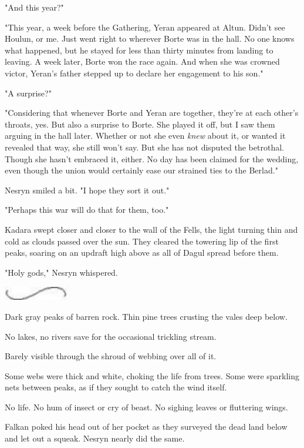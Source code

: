"And this year?"

"This year, a week before the Gathering, Yeran appeared at Altun. Didn't see Houlun, or me. Just went right to wherever Borte was in the hall. No one knows what happened, but he stayed for less than thirty minutes from landing to leaving. A week later, Borte won the race again. And when she was crowned victor, Yeran's father stepped up to declare her engagement to his son."

"A surprise?"

"Considering that whenever Borte and Yeran are together, they're at each other's throats, yes. But also a surprise to Borte. She played it off, but I saw them arguing in the hall later. Whether or not she even
\emph{knew} about it, or wanted it revealed that way, she still won't say. But she has not disputed the betrothal. Though she hasn't embraced it, either. No day has been claimed for the wedding, even though the union would certainly ease our  strained ties to the Berlad."

Nesryn smiled a bit. "I hope they sort it out."

"Perhaps this war will do that for them, too."

Kadara swept closer and closer to the wall of the Fells, the light turning thin and cold as clouds passed over the sun. They cleared the towering lip of the first peaks, soaring on an updraft high above as all of Dagul spread before them.

"Holy gods," Nesryn whispered.

\includegraphics[width=1.12in,height=0.24in]{images/seperator}

Dark gray peaks of barren rock. Thin pine trees crusting the vales deep below.

No lakes, no rivers save for the occasional trickling stream.

Barely visible through the shroud of webbing over all of it.

Some webs were thick and white, choking the life from trees. Some were sparkling nets between peaks, as if they sought to catch the wind itself.

No life. No hum of insect or cry of beast. No sighing leaves or fluttering wings.

Falkan poked his head out of her pocket as they surveyed the dead land below and let out a squeak. Nesryn nearly did the same.

